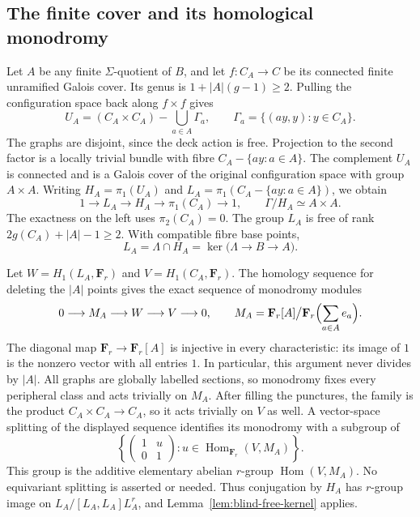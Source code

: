 \subsection{The finite cover and its homological monodromy}

Let $A$ be any finite $\Sigma$-quotient of $B$, and let
$f:C_A\to C$ be its connected finite unramified Galois cover. Its genus
is $1+|A|(g-1)\geq2$. Pulling the configuration space back along
$f\times f$ gives
\[
 U_A=(C_A\times C_A)-\bigcup_{a\in A}\Gamma_a,
 \qquad \Gamma_a=\{(a y,y):y\in C_A\}.
\]
The graphs are disjoint, since the deck action is free. Projection to
the second factor is a locally trivial bundle with fibre
$C_A-\{a y:a\in A\}$. The complement $U_A$ is connected and is a
Galois cover of the original configuration space with group $A\times A$.
Writing $H_A=\pi_1(U_A)$ and
$L_A=\pi_1(C_A-\{a y:a\in A\})$, we obtain
\[
 1\longrightarrow L_A\longrightarrow H_A
 \longrightarrow\pi_1(C_A)\longrightarrow1,
 \qquad \Gamma/H_A\simeq A\times A.
\]
The exactness on the left uses $\pi_2(C_A)=0$. The group $L_A$ is free of
rank $2g(C_A)+|A|-1\geq2$. With compatible fibre base points,
\[
 L_A=\Lambda\cap H_A
   =\ker\bigl(\Lambda\longrightarrow B\longrightarrow A\bigr).
\]

Let $W=H_1(L_A,\mathbf F_r)$ and $V=H_1(C_A,\mathbf F_r)$.
The homology sequence for deleting the $|A|$ points gives the exact
sequence of monodromy modules
\[
 0\longrightarrow M_A\longrightarrow W\longrightarrow V\longrightarrow0,
 \qquad M_A=\mathbf F_r[A]\big/\mathbf F_r\Bigl(\sum_{a\in A}e_a\Bigr).
\]
The diagonal map $\mathbf F_r\to\mathbf F_r[A]$ is injective in every
characteristic: its image of $1$ is the nonzero vector with all entries
$1$. In particular, this argument never divides by $|A|$.
All graphs are globally labelled sections, so monodromy fixes every
peripheral class and acts trivially on $M_A$. After filling the punctures,
the family is the product $C_A\times C_A\to C_A$, so it acts trivially
on $V$ as well. A vector-space splitting of the displayed sequence
identifies its monodromy with a subgroup of
\[
 \left\{\begin{pmatrix}1&u\\0&1\end{pmatrix}:u\in
 \operatorname{Hom}_{\mathbf F_r}(V,M_A)\right\}.
\]
This group is the additive elementary abelian $r$-group
$\operatorname{Hom}(V,M_A)$. No equivariant splitting is asserted or
needed. Thus conjugation by $H_A$ has $r$-group image on
$L_A/[L_A,L_A]L_A^r$, and Lemma~\ref{lem:blind-free-kernel} applies.

